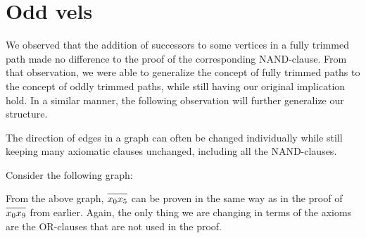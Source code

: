 
\section{Odd vels}
\label{sec:Odd vels}
We observed that the addition of successors to some vertices in a fully trimmed path made no difference to the proof of the corresponding NAND-clause.
From that observation, we were able to generalize the concept of fully trimmed paths to the concept of oddly trimmed paths, while still having our original implication hold.
In a similar manner, the following observation will further generalize our structure.

The direction of edges in a graph can often be changed individually while still keeping many axiomatic clauses unchanged, including all the NAND-clauses.

Consider the following graph:

\begin{figure}[!h]
  \centering
  \caption{}
  \label{fig:vel-example}
\end{figure}
From the above graph, $\ol{x_0x_5}$ can be proven in the same way as in the proof of $\ol{x_0x_9}$ from earlier.
Again, the only thing we are changing in terms of the axioms are the OR-clauses that are not used in the proof.

